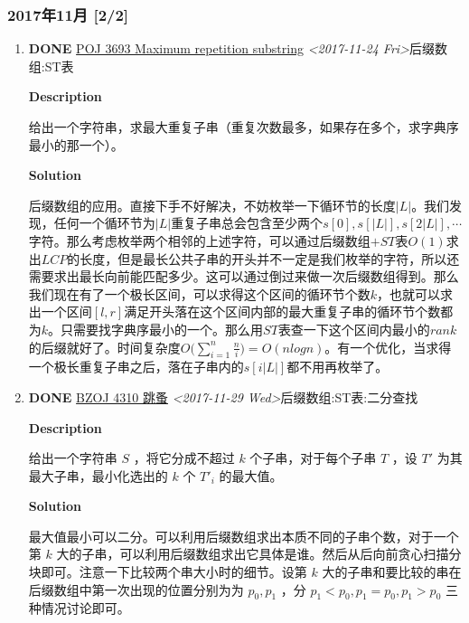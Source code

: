 \documentclass[11pt]{article}
\begin{document}
\subsubsection{2017年11月 [2/2]}
\label{sec-2-2-1}
\begin{enumerate}
\item {\bfseries\sffamily DONE} \href{https://vjudge.net/problem/POJ-3693}{POJ 3693 Maximum repetition substring} \textit{<2017-11-24 Fri>}\hfill{}\textsc{后缀数组:ST表}
\label{sec-2-2-1-1}

\textbf{Description}

给出一个字符串，求最大重复子串（重复次数最多，如果存在多个，求字典序最小的那一个）。

\textbf{Solution}

后缀数组的应用。直接下手不好解决，不妨枚举一下循环节的长度\(|L|\)。我们发现，任何一个循环节为\(|L|\)重复子串总会包含至少两个\(s[0],s[|L|],s[2|L|], \cdots\)字符。那么考虑枚举两个相邻的上述字符，可以通过后缀数组\(+ST\)表\(O(1)\)求出\(LCP\)的长度，但是最长公共子串的开头并不一定是我们枚举的字符，所以还需要求出最长向前能匹配多少。这可以通过倒过来做一次后缀数组得到。那么我们现在有了一个极长区间，可以求得这个区间的循环节个数\(k\)，也就可以求出一个区间\([l,r]\)满足开头落在这个区间内部的最大重复子串的循环节个数都为\(k\)。只需要找字典序最小的一个。那么用\(ST\)表查一下这个区间内最小的\(rank\)的后缀就好了。时间复杂度\(O\Big(\sum_{i=1}^{n}\frac{n}{i}\Big)=O(nlogn)\)。有一个优化，当求得一个极长重复子串之后，落在子串内的\(s[i|L|]\)都不用再枚举了。

\item {\bfseries\sffamily DONE} \href{http://www.lydsy.com/JudgeOnline/problem.php?id=4310}{BZOJ 4310 跳蚤} \textit{<2017-11-29 Wed>}\hfill{}\textsc{后缀数组:ST表:二分查找}
\label{sec-2-2-1-2}

\textbf{Description}

给出一个字符串 $S$ ，将它分成不超过 $k$ 个子串，对于每个子串 $T$ ，设 $T'$ 为其最大子串，最小化选出的 $k$ 个 $T'_i$ 的最大值。

\textbf{Solution}

最大值最小可以二分。可以利用后缀数组求出本质不同的子串个数，对于一个第 $k$ 大的子串，可以利用后缀数组求出它具体是谁。然后从后向前贪心扫描分块即可。注意一下比较两个串大小时的细节。设第 $k$ 大的子串和要比较的串在后缀数组中第一次出现的位置分别为为 $p_0,p_1$ ，分 $p_1 < p_0,p_1=p_0,p_1 > p_0$ 三种情况讨论即可。
\end{enumerate}
\end{document}
